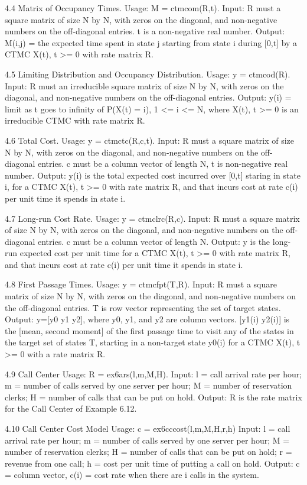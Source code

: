 4.4 Matrix of Occupancy Times.
Usage:  M = ctmcom(R,t).
Input:  R must a square matrix of size N by N, with zeros on the diagonal, and non-negative numbers on the off-diagonal entries. t is a non-negative real number. 
Output: M(i,j) = the expected time spent in  state j starting from state i during [0,t] by a CTMC {X(t), t >= 0} with rate matrix R.

4.5 Limiting Distribution and Occupancy Distribution.
Usage:  y = ctmcod(R).
Input: R must an irreducible square matrix of size N by N, with zeros on the diagonal, and non-negative numbers on the off-diagonal entries. 
Output:  y(i) = limit as t goes to infinity of  P(X(t) = i),  1 <= i <= N, where {X(t), t >= 0} is an irreducible CTMC with rate matrix R.
 
4.6 Total Cost.
Usage:  y = ctmctc(R,c,t).
Input: R must a square matrix of size N by N, with zeros on the diagonal, and non-negative numbers on the off-diagonal entries. c must be a column vector of length N, t is non-negative real number. 
Output:  y(i) is the total expected cost incurred over [0,t] staring in state i, for a CTMC {X(t), t >= 0} with rate matrix R, and that incurs cost at rate  c(i) per unit  time it spends in state i.
 
4.7 Long-run Cost Rate.
Usage:  y = ctmclrc(R,c).
Input: R must a square matrix of size N by N, with zeros on the diagonal, and non-negative numbers on the off-diagonal entries. c must be a column vector of length N. 
Output:  y is the long-run expected cost per unit time for a CTMC {X(t), t >= 0}  with rate matrix R, and that incurs cost at rate  c(i) per unit  time it spends in state i.
 
4.8 First Passage Times.
Usage:  y = ctmcfpt(T,R).
Input: R must a square matrix of size N by N, with zeros on the diagonal, and non-negative numbers on the off-diagonal entries. T is row vector representing the set of target states. 
Output:  y=[y0 y1 y2], where y0, y1, and y2 are column vectors.  [y1(i) y2(i)] is the [mean, second moment] of the first passage time to visit any of the states in the target set of states T, starting in a non-target state y0(i) for a CTMC {X(t), t >= 0} with a rate matrix R.
 
4.9 Call Center
Usage:  R = ex6ars(l,m,M,H).
Input: l =  call arrival rate per hour;
m =  number of calls served by one server per hour;
M = number of reservation clerks;
H =  number of calls that can be put on hold.
Output: R is the rate matrix for the Call Center of Example  6.12.

4.10 Call Center Cost Model
Usage:  c = ex6cccost(l,m,M,H,r,h)
Input: l =  call arrival rate per hour;
m =  number of calls served by one server per hour;
M = number of reservation clerks;
H =  number of calls that can be put on hold;
r =  revenue from one call;
h = cost per unit time of putting a call on hold.
Output: c = column vector, c(i) = cost rate when there are i calls in the system. 

